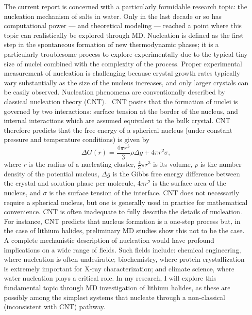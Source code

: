 \documentclass[titlepage,11pt]{article}
\newcommand{\HOS}{{\color{red}HOS}}
\begin{document}
The current report is concerned with a particularly formidable research topic: the nucleation mechanism of salts in water. Only in the last decade or so has computational power --- and theoretical modeling --- reached a point where this topic can realistically be explored through MD. Nucleation is defined as the first step in the spontaneous formation of new thermodynamic phases; it is a particularly troublesome process to explore experimentally due to the typical tiny size of nuclei combined with the complexity of the process. 
Proper experimental measurement of nucleation is challenging because crystal growth rates typically vary substantially as the size of the nucleus increases, and only larger crystals can be easily observed. Nucleation phenomena are conventionally described by classical nucleation theory (CNT).~\cite{Karthika2016} CNT posits that the formation of nuclei is governed by two interactions: surface tension at the border of the nucleus, and internal interactions which are assumed equivalent to the bulk crystal. CNT therefore predicts that the free energy of a spherical nucleus (under constant pressure and temperature conditions) is given by
\begin{equation}
	\Delta G (r) = \frac {4 \pi r ^ { 3 } } { 3 }\rho \Delta g + 4 \pi r^{ 2 } \sigma,
\end{equation}
where $r$ is the radius of a nucleating cluster, $\frac{4}{3}\pi r^{3}$ is its volume, $\rho$ is the number density of the potential nucleus, $\Delta g$ is the Gibbs free energy difference between the crystal and solution phase per molecule, $4\pi r^{2}$ is the surface area of the nucleus, and $\sigma$ is the surface tension of the interface. CNT does not necessarily require a spherical nucleus, but one is generally used in practice for mathematical convenience. CNT is often inadequate to fully describe the details of nucleation.~\cite{Karthika2016} For instance, CNT predicts that nucleus formation is a one-step process but, in the case of lithium halides, preliminary MD studies show this not to be the case.~\cite{Lanaro2016,Lanaro2018} A complete mechanistic description of nucleation would have profound implications on a wide range of fields. Such fields include: chemical engineering, where nucleation is often undesirable; biochemistry, where protein crystallization is extremely important for X-ray characterization; and climate science, where water nucleation plays a critical role. In my research, I will explore this fundamental topic through MD investigation of lithium halides, as these are possibly among the simplest systems that nucleate through a non-classical (inconsistent with CNT) pathway.~\cite{Lanaro2018} 
\end{document}

